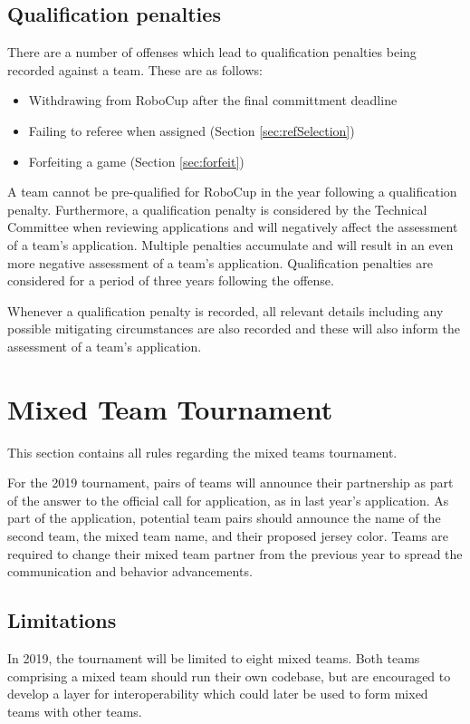 \documentclass[12pt]{article}
\begin{document}
\subsection{Qualification penalties}
\label{sec:qualificationPenalties}

There are a number of offenses which lead to qualification penalties being recorded against a team. These are as follows:
\begin{itemize}
    \item Withdrawing from RoboCup after the final committment deadline
    \item Failing to referee when assigned (Section \ref {sec:refSelection})
    \item Forfeiting a game (Section \ref {sec:forfeit})
\end{itemize}

A team cannot be pre-qualified for RoboCup in the year following a qualification penalty. Furthermore, a qualification penalty is considered by the Technical Committee when reviewing applications and will negatively affect the assessment of a team's application. Multiple penalties accumulate and will result in an even more negative assessment of a team's application. Qualification penalties are considered for a period of three years following the offense.

Whenever a qualification penalty is recorded, all relevant details including any possible mitigating circumstances are also recorded and these will also inform the assessment of a team's application.

\section{Mixed Team Tournament}
\label{sec:mixedTeamTournament}
This section contains all rules regarding the mixed teams tournament.

For the 2019 tournament, pairs of teams will announce their partnership as part of the answer to the official call for application, as in last year's application. As part of the application, potential team pairs should announce the name of the second team, the mixed team name, and their proposed jersey color. Teams are required to change their mixed team partner from the previous year to spread the communication and behavior advancements.

\subsection{Limitations}
In 2019, the tournament will be limited to eight mixed teams. Both teams comprising a mixed team should run their own codebase, but are encouraged to develop a layer for interoperability which could later be used to form mixed teams with other teams. 
\end{document}
